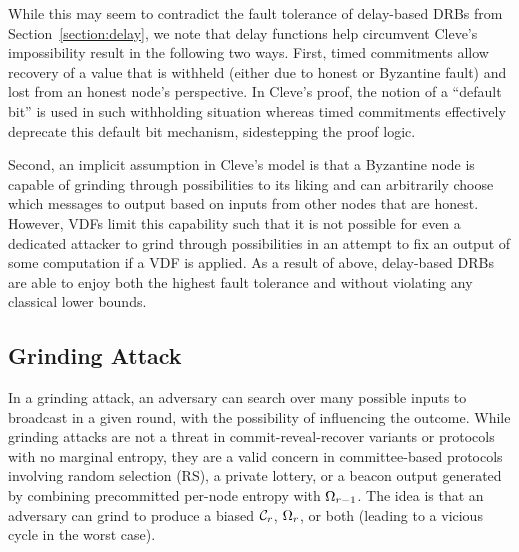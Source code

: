 While this may seem to contradict the fault tolerance of delay-based DRBs from Section~\ref{section:delay}, we note that delay functions help circumvent Cleve's impossibility result in the following two ways.
First, timed commitments allow recovery of a value that is withheld (either due to honest or Byzantine fault) and lost from an honest node's perspective.
In Cleve's proof, the notion of a ``default bit'' is used in such withholding situation whereas timed commitments effectively deprecate this default bit mechanism, sidestepping the proof logic.

Second, an implicit assumption in Cleve's model is that a Byzantine node is capable of grinding through possibilities to its liking and can arbitrarily choose which messages to output based on inputs from other nodes that are honest.
However, VDFs limit this capability such that it is not possible for even a dedicated attacker to grind through possibilities in an attempt to fix an output of some computation if a VDF is applied.
As a result of above, delay-based DRBs are able to enjoy both the highest fault tolerance and \drbsecurity without violating any classical lower bounds.

\subsection{Grinding Attack}
In a grinding attack, an adversary can search over many possible inputs to broadcast in a given round, with the possibility of influencing the outcome. While grinding attacks are not a threat in commit-reveal-recover variants or protocols with no marginal entropy, they are a valid concern in committee-based protocols involving random selection (RS), a private lottery, or a beacon output generated by combining precommitted per-node entropy with $\Omega_{r - 1}$. The idea is that an adversary can grind to produce a biased $\mathcal{C}_r$, $\Omega_r$, or both (leading to a vicious cycle in the worst case).

